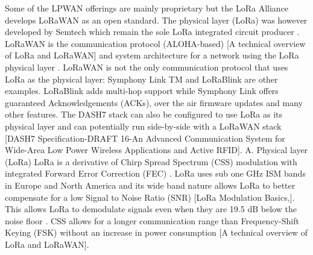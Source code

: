 Some of the LPWAN offerings are mainly proprietary but the LoRa Alliance develops LoRaWAN as an open standard.
The physical layer (LoRa) was however developed by Semtech which remain the sole LoRa integrated circuit producer \cite{bankov_limits_2016}.
LoRaWAN is the communication protocol (ALOHA-based) [A technical overview of LoRa and LoRaWAN] and system architecture for a network using the LoRa physical layer \cite{wixted_evaluation_2016}.
LoRaWAN is not the only communication protocol that uses LoRa as the physical layer:
	Symphony Link TM and LoRaBlink are other examples.
LoRaBlink \cite{bor_lora_nodate} adds multi-hop support while Symphony Link offers guaranteed Acknowledgements (ACKs),
	over the air firmware updates and many other features.
The DASH7 stack can also be configured to use LoRa as its physical layer and can potentially run side-by-side with a LoRaWAN stack [DASH7 Speciﬁcation-DRAFT 16-An Advanced Communication System for Wide-Area Low Power Wireless Applications and Active RFID].
A.
Physical layer (LoRa) LoRa is a derivative of Chirp Spread Spectrum (CSS) modulation with integrated Forward Error Correction (FEC) \cite{reynders_chirp_2016}.
LoRa uses sub one GHz ISM bands in Europe and North America and its wide band nature allows LoRa to better compensate for a low Signal to Noise Ratio (SNR) [LoRa Modulation Basics,].
This allows LoRa to demodulate signals even when they are 19.5 dB below the noise floor \cite{bor_lora_2016}.
CSS allows for a longer communication range than Frequency-Shift Keying (FSK) without an increase in power consumption [A technical overview of LoRa and LoRaWAN].

